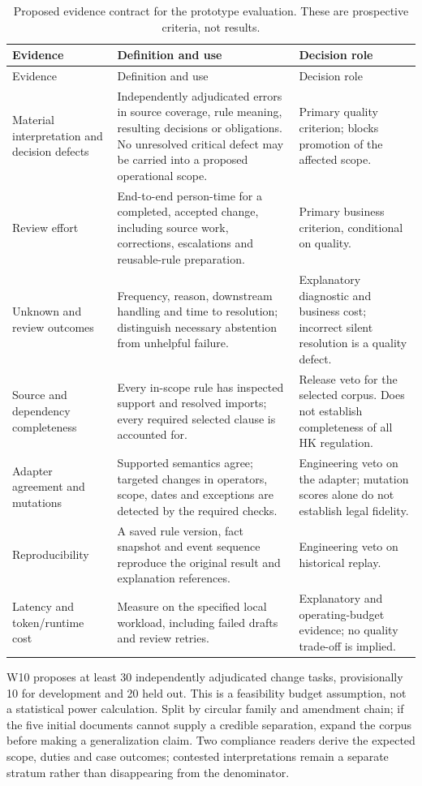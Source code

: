 \begingroup\small
\begin{longtable}{P{0.25\textwidth}P{0.39\textwidth}P{0.26\textwidth}}
\caption{Proposed evidence contract for the prototype evaluation. These are
prospective criteria, not results.}\label{tab:evaluation}\\
\toprule Evidence & Definition and use & Decision role \\\midrule
\endfirsthead
\toprule Evidence & Definition and use & Decision role \\\midrule
\endhead
Material interpretation and decision defects & Independently adjudicated errors
in source coverage, rule meaning, resulting decisions or obligations. No unresolved
critical defect may be carried into a proposed operational scope. & Primary quality
criterion; blocks promotion of the affected scope.\\
Review effort & End-to-end person-time for a completed, accepted change, including
source work, corrections, escalations and reusable-rule preparation. & Primary
business criterion, conditional on quality.\\
Unknown and review outcomes & Frequency, reason, downstream handling and time to
resolution; distinguish necessary abstention from unhelpful failure. & Explanatory
diagnostic and business cost; incorrect silent resolution is a quality defect.\\
Source and dependency completeness & Every in-scope rule has inspected support and
resolved imports; every required selected clause is accounted for. & Release veto
for the selected corpus. Does not establish completeness of all HK regulation.\\
Adapter agreement and mutations & Supported semantics agree; targeted changes in
operators, scope, dates and exceptions are detected by the required checks. &
Engineering veto on the adapter; mutation scores alone do not establish legal fidelity.\\
Reproducibility & A saved rule version, fact snapshot and event sequence reproduce
the original result and explanation references. & Engineering veto on historical replay.\\
Latency and token/runtime cost & Measure on the specified local workload, including
failed drafts and review retries. & Explanatory and operating-budget evidence; no
quality trade-off is implied.\\
\bottomrule
\end{longtable}
\endgroup

W10 proposes at least 30 independently adjudicated change tasks, provisionally
10 for development and 20 held out. This is a feasibility budget assumption,
not a statistical power calculation. Split by circular family and amendment
chain; if the five initial documents cannot supply a credible separation, expand
the corpus before making a generalization claim. Two compliance readers derive
the expected scope, duties and case outcomes; contested interpretations remain
a separate stratum rather than disappearing from the denominator.

